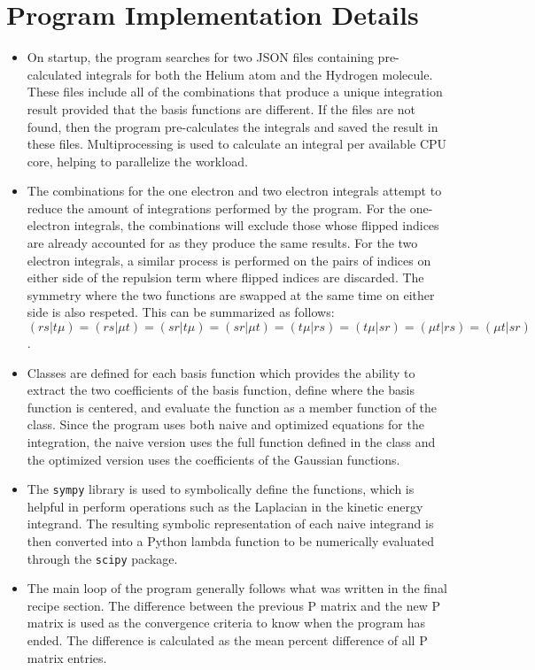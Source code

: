 \documentclass[10pt, oneside, letterpaper]{article}
\begin{document}
\section{Program Implementation Details}

\begin{itemize}
  \item On startup, the program searches for two JSON files containing pre-calculated integrals for both the Helium atom and the Hydrogen molecule. These files include all of the combinations that produce a unique integration result provided that the basis functions are different. If the files are not found, then the program pre-calculates the integrals and saved the result in these files. Multiprocessing is used to calculate an integral per available CPU core, helping to parallelize the workload.
  \item The combinations for the one electron and two electron integrals attempt to reduce the amount of integrations performed by the program. For the one-electron integrals, the combinations will exclude those whose flipped indices are already accounted for as they produce the same results. For the two electron integrals, a similar process is performed on the pairs of indices on either side of the repulsion term where flipped indices are discarded. The symmetry where the two functions are swapped at the same time on either side is also respeted. This can be summarized as follows:
  $(rs|t\mu) = (rs|\mu t) = (sr|t\mu) = (sr|\mu t) = (t\mu|rs) = (t\mu|sr) = (\mu t|rs) = (\mu t|sr)$ \cite{hartree-fock-in-100-lines}.
  \item Classes are defined for each basis function which provides the ability to extract the two coefficients of the basis function, define where the basis function is centered, and evaluate the function as a member function of the class. Since the program uses both naive and optimized equations for the integration, the naive version uses the full function defined in the class and the optimized version uses the coefficients of the Gaussian functions.
  \item The \texttt{sympy} library is used to symbolically define the functions, which is helpful in perform operations such as the Laplacian in the kinetic energy integrand. The resulting symbolic representation of each naive integrand is then converted into a Python lambda function to be numerically evaluated through the \texttt{scipy} package.
  \item The main loop of the program generally follows what was written in the final recipe section. The difference between the previous P matrix and the new P matrix is used as the convergence criteria to know when the program has ended. The difference is calculated as the mean percent difference of all P matrix entries.
\end{itemize}
\end{document}
